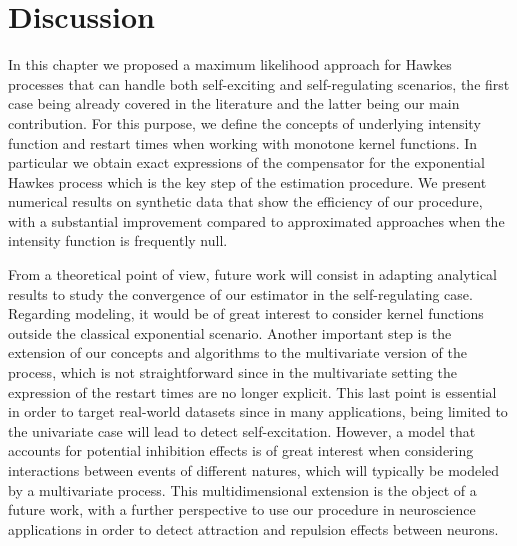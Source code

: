\section{Discussion}

In this chapter we proposed a maximum likelihood approach for Hawkes processes that can handle both self-exciting and self-regulating scenarios, the first case being already covered in the literature and the latter being our main contribution. For this purpose, we define the concepts of underlying intensity function and restart times when working with monotone kernel functions. In particular we obtain exact expressions of the compensator for the exponential Hawkes process which is the key step of the estimation procedure.
We present numerical results on synthetic data that show the efficiency of our procedure, with a substantial improvement compared to approximated approaches when the intensity function is frequently null.

From a theoretical point of view, future work will consist in adapting analytical results to study the convergence of our estimator in the self-regulating case. Regarding modeling, it would be of great interest to consider kernel functions outside the classical exponential scenario.
Another important step is the extension of our concepts and algorithms to the multivariate version of the process, which is not straightforward since in the multivariate setting the expression of the restart times are no longer explicit.
This last point is essential in order to target real-world datasets since in many applications, being limited to the univariate case will lead to detect self-excitation. However, a model that accounts for potential inhibition effects is of great interest when considering interactions between events of different natures, which will typically be modeled by a multivariate process. This multidimensional extension is the object of a future work, with a further perspective to use our procedure in neuroscience applications in order to detect attraction and repulsion effects between neurons.

